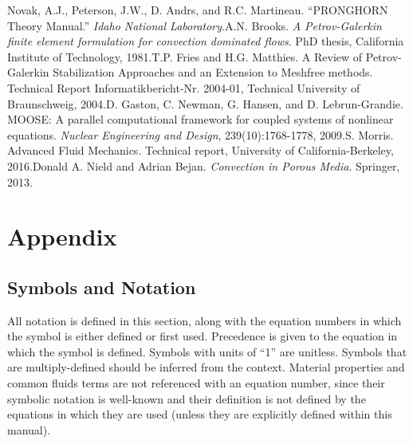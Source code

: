 \documentclass[10pt]{article}
\numberwithin{equation}{section} %
\begin{document}
\begin{flushleft}
[1]\quad Novak, A.J., Peterson, J.W., D. Andrs, and R.C. Martineau. ``PRONGHORN Theory Manual.'' \textit{Idaho National Laboratory}.\newline\newline
[2]\quad A.N. Brooks. \textit{A Petrov-Galerkin finite element formulation for convection dominated flows}. PhD thesis, California Institute of Technology, 1981.\newline\newline
[3]\quad T.P. Fries and H.G. Matthies. A Review of Petrov-Galerkin Stabilization Approaches and an Extension to Meshfree methods. Technical Report Informatikbericht-Nr. 2004-01, Technical University of Braunschweig, 2004.\newline\newline
[4]\quad D. Gaston, C. Newman, G. Hansen, and D. Lebrun-Grandie. MOOSE: A parallel computational framework for coupled systems of nonlinear equations. \textit{Nuclear Engineering and Design}, 239(10):1768-1778, 2009.\newline\newline
[5]\quad S. Morris. Advanced Fluid Mechanics. Technical report, University of California-Berkeley, 2016.\newline\newline
[6]\quad Donald A. Nield and Adrian Bejan. \textit{Convection in Porous Media}. Springer, 2013.

\end{flushleft}









\clearpage
\section{Appendix}

\subsection{Symbols and Notation}
All notation is defined in this section, along with the equation numbers in which the symbol is either defined or first used. Precedence is given to the equation in which the symbol is defined. Symbols with units of ``1'' are unitless. Symbols that are multiply-defined should be inferred from the context. Material properties and common fluids terms are not referenced with an equation number, since their symbolic notation is well-known and their definition is not defined by the equations in which they are used (unless they are explicitly defined within this manual).\newline
\end{document}
